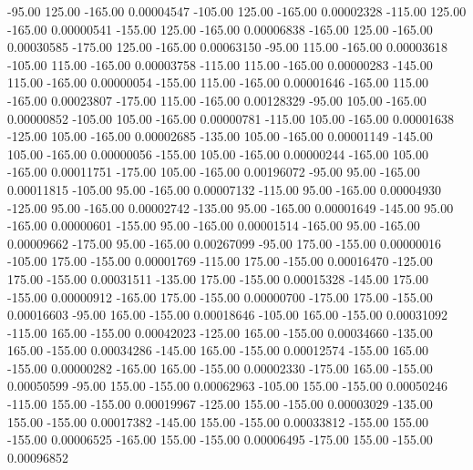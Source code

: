     -95.00    125.00   -165.00     0.00004547
   -105.00    125.00   -165.00     0.00002328
   -115.00    125.00   -165.00     0.00000541
   -155.00    125.00   -165.00     0.00006838
   -165.00    125.00   -165.00     0.00030585
   -175.00    125.00   -165.00     0.00063150
    -95.00    115.00   -165.00     0.00003618
   -105.00    115.00   -165.00     0.00003758
   -115.00    115.00   -165.00     0.00000283
   -145.00    115.00   -165.00     0.00000054
   -155.00    115.00   -165.00     0.00001646
   -165.00    115.00   -165.00     0.00023807
   -175.00    115.00   -165.00     0.00128329
    -95.00    105.00   -165.00     0.00000852
   -105.00    105.00   -165.00     0.00000781
   -115.00    105.00   -165.00     0.00001638
   -125.00    105.00   -165.00     0.00002685
   -135.00    105.00   -165.00     0.00001149
   -145.00    105.00   -165.00     0.00000056
   -155.00    105.00   -165.00     0.00000244
   -165.00    105.00   -165.00     0.00011751
   -175.00    105.00   -165.00     0.00196072
    -95.00     95.00   -165.00     0.00011815
   -105.00     95.00   -165.00     0.00007132
   -115.00     95.00   -165.00     0.00004930
   -125.00     95.00   -165.00     0.00002742
   -135.00     95.00   -165.00     0.00001649
   -145.00     95.00   -165.00     0.00000601
   -155.00     95.00   -165.00     0.00001514
   -165.00     95.00   -165.00     0.00009662
   -175.00     95.00   -165.00     0.00267099
    -95.00    175.00   -155.00     0.00000016
   -105.00    175.00   -155.00     0.00001769
   -115.00    175.00   -155.00     0.00016470
   -125.00    175.00   -155.00     0.00031511
   -135.00    175.00   -155.00     0.00015328
   -145.00    175.00   -155.00     0.00000912
   -165.00    175.00   -155.00     0.00000700
   -175.00    175.00   -155.00     0.00016603
    -95.00    165.00   -155.00     0.00018646
   -105.00    165.00   -155.00     0.00031092
   -115.00    165.00   -155.00     0.00042023
   -125.00    165.00   -155.00     0.00034660
   -135.00    165.00   -155.00     0.00034286
   -145.00    165.00   -155.00     0.00012574
   -155.00    165.00   -155.00     0.00000282
   -165.00    165.00   -155.00     0.00002330
   -175.00    165.00   -155.00     0.00050599
    -95.00    155.00   -155.00     0.00062963
   -105.00    155.00   -155.00     0.00050246
   -115.00    155.00   -155.00     0.00019967
   -125.00    155.00   -155.00     0.00003029
   -135.00    155.00   -155.00     0.00017382
   -145.00    155.00   -155.00     0.00033812
   -155.00    155.00   -155.00     0.00006525
   -165.00    155.00   -155.00     0.00006495
   -175.00    155.00   -155.00     0.00096852
